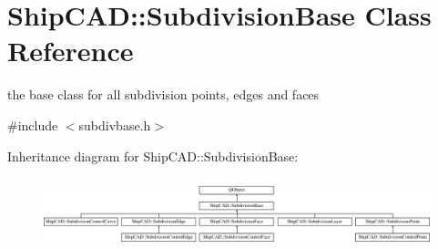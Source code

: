 \hypertarget{classShipCAD_1_1SubdivisionBase}{\section{Ship\-C\-A\-D\-:\-:Subdivision\-Base Class Reference}
\label{classShipCAD_1_1SubdivisionBase}
}


the base class for all subdivision points, edges and faces  




{\ttfamily \#include $<$subdivbase.\-h$>$}

Inheritance diagram for Ship\-C\-A\-D\-:\-:Subdivision\-Base\-:\begin{figure}[H]
\begin{center}
\leavevmode
\includegraphics[height=2.045662cm]{classShipCAD_1_1SubdivisionBase}
\end{center}
\end{figure}
